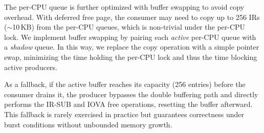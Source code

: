 The per-CPU queue is further optimized with buffer swapping to avoid copy overhead.
With deferred free page, the consumer may need to copy up to 256 IRs ($\sim$10\,KB) 
    from the per-CPU queues, which is non-trivial under the per-CPU lock.
We implement buffer swapping by pairing each \emph{active} per-CPU queue with a \emph{shadow} queue.
In this way, we replace the copy operation with a simple pointer swap,
    minimizing the time holding the per-CPU lock and thus the time 
    blocking active producers.

As a fallback, if the active buffer reaches its capacity (256 entries) before the consumer drains it,
the producer bypasses the double buffering path and directly performs the IR-SUB and IOVA free operations,
resetting the buffer afterward.
This fallback is rarely exercised in practice but guarantees correctness
under burst conditions without unbounded memory growth.
\fi 



